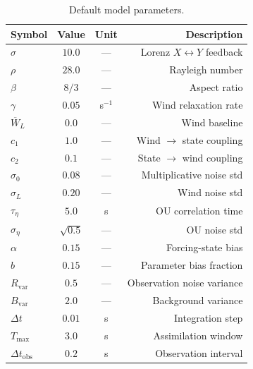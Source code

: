 \documentclass[11pt,a4paper]{article}
\begin{document}
\begin{table}[ht]
\centering
\caption{Default model parameters.}
\begin{tabular}{lccr}
\toprule
Symbol & Value & Unit & Description\\
\midrule
$\sigma$ & $10.0$ & — & Lorenz $X\leftrightarrow Y$ feedback\\
$\rho$ & $28.0$ & — & Rayleigh number\\
$\beta$ & $8/3$ & — & Aspect ratio\\
$\gamma$ & $0.05$ & s$^{-1}$ & Wind relaxation rate\\
$\overline W_L$ & $0.0$ & — & Wind baseline\\
$c_1$ & $1.0$ & — & Wind $\to$ state coupling\\
$c_2$ & $0.1$ & — & State $\to$ wind coupling\\
$\sigma_0$ & $0.08$ & — & Multiplicative noise std\\
$\sigma_L$ & $0.20$ & — & Wind noise std\\
$\tau_\eta$ & $5.0$ & s & OU correlation time\\
$\sigma_\eta$ & $\sqrt{0.5}$ & — & OU noise std\\
$\alpha$ & $0.15$ & — & Forcing-state bias\\
$b$ & $0.15$ & — & Parameter bias fraction\\
$R_{\text{var}}$ & $0.5$ & — & Observation noise variance\\
$B_{\text{var}}$ & $2.0$ & — & Background variance\\
$\Delta t$ & $0.01$ & s & Integration step\\
$T_{\max}$ & $3.0$ & s & Assimilation window\\
$\Delta t_{\text{obs}}$ & $0.2$ & s & Observation interval\\
\bottomrule
\end{tabular}
\end{table}
\end{document}
